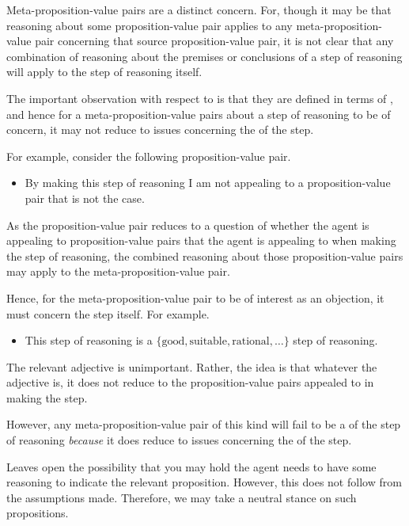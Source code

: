 \begin{note}
  Meta-proposition-value pairs are a distinct concern.
  For, though it may be that reasoning about some proposition-value pair applies to any meta-proposition-value pair concerning that source proposition-value pair, it is not clear that any combination of reasoning about the premises or conclusions of a step of reasoning will apply to the step of reasoning itself.
\end{note}

\begin{note}
  The important observation with respect to  is that they are defined in terms of , and hence for a meta-proposition-value pairs about a step of reasoning to be of concern, it may not reduce to issues concerning the  of the step.

  For example, consider the following proposition-value pair.
  \begin{itemize}
  \item By making this step of reasoning I am not appealing to a proposition-value pair that is not the case.
  \end{itemize}
  As the proposition-value pair reduces to a question of whether the agent is appealing to proposition-value pairs that the agent is appealing to when making the step of reasoning, the combined reasoning about those proposition-value pairs may apply to the meta-proposition-value pair.
\end{note}

\begin{note}
  Hence, for the meta-proposition-value pair to be of interest as an objection, it must concern the step itself.
  For example.
  \begin{itemize}
  \item This step of reasoning is a \(\{\text{good},\text{suitable},\text{rational},\dots\}\) step of reasoning.
  \end{itemize}
  The relevant adjective is unimportant.
  Rather, the idea is that whatever the adjective is, it does not reduce to the proposition-value pairs appealed to in making the step.

  However, any meta-proposition-value pair of this kind will fail to be a  of the step of reasoning \emph{because} it does reduce to issues concerning the  of the step.
\end{note}

\begin{note}
  \color{red}
  Leaves open the possibility that you may hold the agent needs to have some reasoning to indicate the relevant proposition.
  However, this does not follow from the assumptions made.
  Therefore, we may take a neutral stance on such propositions.
\end{note}

